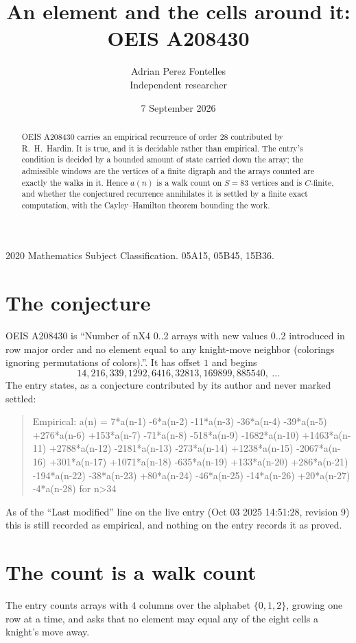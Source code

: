 \documentclass[11pt,a4paper]{article}
\title{An element and the cells around it: OEIS A208430}
\author{Adrian Perez Fontelles\\ \small Independent researcher}
\date{7 September 2026}
\theoremstyle{plain}
\theoremstyle{definition}
\begin{document}
\maketitle

\begin{abstract}
OEIS A208430 carries an empirical recurrence of order $28$ contributed by R.~H.~Hardin. It is
true, and it is decidable rather than empirical. The entry's condition is decided by a bounded amount of state carried down the array; the
admissible windows are the vertices of a finite digraph and the arrays counted are exactly the
walks in it. Hence $a(n)$ is a walk count on $S=83$ vertices and is $C$-finite, and whether the
conjectured recurrence annihilates it is settled by a finite exact computation, with the
Cayley--Hamilton theorem bounding the work.
\end{abstract}

\noindent\small 2020 Mathematics Subject Classification. 05A15, 05B45, 15B36.\normalsize

\section{The conjecture}

OEIS A208430 is ``Number of nX4 0..2 arrays with new values 0..2 introduced in row major order and no element equal to any knight-move neighbor (colorings ignoring permutations of colors).''. It has offset $1$ and begins
\[
14, 216, 339, 1292, 6416, 32813, 169899, 885540,\ \dots
\]
The entry states, as a conjecture contributed by its author and never marked settled:
\begin{quote}
Empirical: a(n) = 7*a(n-1) -6*a(n-2) -11*a(n-3) -36*a(n-4) -39*a(n-5) +276*a(n-6) +153*a(n-7) -71*a(n-8) -518*a(n-9) -1682*a(n-10) +1463*a(n-11) +2788*a(n-12) -2181*a(n-13) -273*a(n-14) +1238*a(n-15) -2067*a(n-16) +301*a(n-17) +1071*a(n-18) -635*a(n-19) +133*a(n-20) +286*a(n-21) -194*a(n-22) -38*a(n-23) +80*a(n-24) -46*a(n-25) -14*a(n-26) +20*a(n-27) -4*a(n-28) for n>34
\end{quote}
As of the ``Last modified'' line on the live entry (Oct 03 2025 14:51:28, revision 9) this is still
recorded as empirical, and nothing on the entry records it as proved.

\section{The count is a walk count}

The entry counts arrays with $4$ columns over the alphabet $\{0,1,2\}$, growing one row at a time, and asks that no element may equal any of the eight cells a knight's move away.
\end{document}
